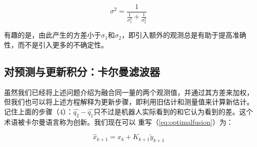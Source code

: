 \begin{equation}
\sigma^2=\frac{1}{\frac{1}{\sigma_1^2}+\frac{1}{\sigma_2^2}}
\end{equation}


有趣的是，由此产生的方差小于$\sigma_1$和$\sigma_2$，即引入额外的观测总是有助于提高准确性，而不是引入更多的不确定性。


\subsection{对预测与更新积分：卡尔曼滤波器}
虽然我们已经将上述问题介绍为融合同一量的两个观测值，并通过其方差来加权，但我们也可以将上述方程解释为更新步骤，即利用旧估计和测量值来计算新估计。记住上面的步骤（4）：$\hat{q_2}-\hat{q_1}$只不过是机器人实际看到的和它认为看到的差。这个术语被卡尔曼语言称为创新。我们现在可以
重写（\ref{eq:optimalfusion}）为：

\begin{equation}
\hat{x}_{k+1}=\hat{x}_k+K_{k+1}\tilde{y}_{k+1}
\end{equation}


